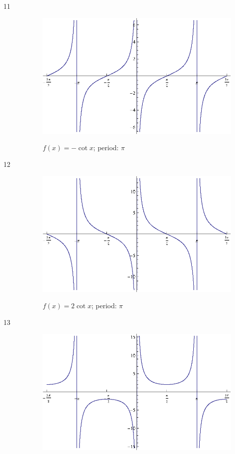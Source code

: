 \documentclass{exam}
\begin{document}
\begin{description}
      \item[11]
        \begin{figure}[H]
          \centering
          \includegraphics[scale=0.9]{exercise11.eps}

          $f(x) = - \cot x$; period: $\pi$
        \end{figure}

      \item[12]
        \begin{figure}[H]
          \centering
          \includegraphics[scale=0.9]{exercise12.eps}

          $f(x) = 2 \cot x$; period: $\pi$
        \end{figure}

      \item[13]
        \begin{figure}[H]
          \centering
          \includegraphics[scale=0.9]{exercise13.eps}


\end{figure}
\end{description}
\end{document}
